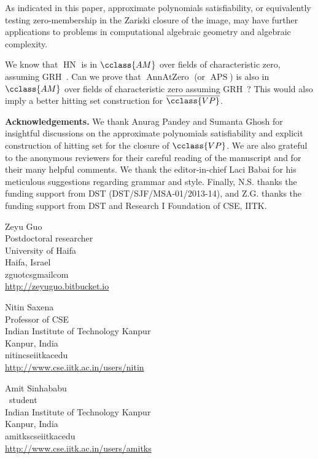 \documentclass{toc}
\newcommand{\AM}{\cclass{AM}\xspace}  %
\newcommand{\VP}{\cclass{VP}\xspace}  %
\newcommand{\VPbar}{\overline{\VP}\xspace}  %
\DeclareMathOperator{\APS}{\mathrm{APS}\xspace} %
\DeclareMathOperator{\AnnAtZero}{\mathrm{AnnAtZero}\xspace} %
\DeclareMathOperator{\HN}{\mathrm{HN}\xspace} %
\begin{document}
\smallskip
 As indicated in this paper, approximate polynomials satisfiability, or equivalently testing zero-membership in the Zariski closure of the image, may have further applications to problems in computational algebraic geometry and algebraic complexity. 

 We know that
 $\HN$ %
 is in $\AM$ over fields of characteristic zero, assuming GRH~\cite{koiran1996hilbert}. Can we 
%
prove that $\AnnAtZero$ (or $\APS$) is also in $\AM$ over %
 fields of characteristic zero assuming GRH~\cite{Kay09}? This would also imply a better hitting set construction for %
 $\VPbar$.


\bigskip\noindent
\textbf{Acknowledgements.}
We thank Anurag Pandey and Sumanta Ghosh for insightful discussions on the approximate polynomials satisfiability and explicit construction of hitting set for the closure of 
%
$\VP$. %
We are also grateful to the anonymous reviewers for their careful reading of the manuscript and for their many helpful comments. We thank the editor-in-chief Laci Babai for his meticulous suggestions regarding grammar and style.
Finally, N.S. thanks the funding support from DST (DST/SJF/MSA-01/2013-14), and Z.G. thanks the funding support from DST and Research I Foundation of CSE, IITK.

\nocite{lidl}

%
%
%
%


%
%
%
%
\begin{tocauthors}
\begin{tocinfo}[guo]
 Zeyu Guo\\
 Postdoctoral researcher\\
%
%
%
%
University of Haifa\\ %
Haifa, Israel\\ %
zguotcs\tocat{}gmail\tocdot{}com\\ %
\url{http://zeyuguo.bitbucket.io} %
\end{tocinfo}
\begin{tocinfo}[saxena]
Nitin Saxena\\
%
Professor of CSE\\  %
Indian Institute of Technology Kanpur\\
Kanpur, India\\
nitin\tocat{}cse\tocdot{}iitk\tocdot{}ac\tocdot{}edu\\
\url{http://www.cse.iitk.ac.in/users/nitin}
\end{tocinfo}
\begin{tocinfo}[sinhababu]
Amit Sinhababu\\
\phd~student\\
Indian Institute of Technology Kanpur\\
Kanpur, India\\
amitks\tocat{}cse\tocdot{}iitk\tocdot{}ac\tocdot{}edu\\
\url{http://www.cse.iitk.ac.in/users/amitks}
\end{tocinfo}
\end{tocauthors}
\end{document}

